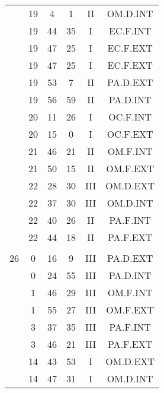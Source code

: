 \documentclass[12pt, a4paper]{article}
\begin{document}
\begin{multicols}{3}
{\begin{tabular}{c c c c c c}
	 	 	 	 & 19 & 4 & 1 & II & OM.D.INT\\%
	 	 	 	 & 19 & 44 & 35 & I & EC.F.INT\\%
	 	 	 	 & 19 & 47 & 25 & I & EC.F.EXT\\%
	 	 	 	 & 19 & 47 & 25 & I & EC.F.EXT\\%
	 	 	 	 & 19 & 53 & 7 & II & PA.D.EXT\\%
	 	 	 	 & 19 & 56 & 59 & II & PA.D.INT\\%
	 	 	 	 & 20 & 11 & 26 & I & OC.F.INT\\%
	 	 	 	 & 20 & 15 & 0 & I & OC.F.EXT\\%
	 	 	 	 & 21 & 46 & 21 & II & OM.F.INT\\%
	 	 	 	 & 21 & 50 & 15 & II & OM.F.EXT\\%
	 	 	 	 & 22 & 28 & 30 & III & OM.D.EXT\\%
	 	 	 	 & 22 & 37 & 30 & III & OM.D.INT\\%
	 	 	 	 & 22 & 40 & 26 & II & PA.F.INT\\%
	 	 	 	 & 22 & 44 & 18 & II & PA.F.EXT\\%
	 	 	 	 & & & & & \\%
	 	 	 	26 & 0 & 16 & 9 & III & PA.D.EXT\\%
	 	 	 	 & 0 & 24 & 55 & III & PA.D.INT\\%
	 	 	 	 & 1 & 46 & 29 & III & OM.F.INT\\%
	 	 	 	 & 1 & 55 & 27 & III & OM.F.EXT\\%
	 	 	 	 & 3 & 37 & 35 & III & PA.F.INT\\%
	 	 	 	 & 3 & 46 & 21 & III & PA.F.EXT\\%
	 	 	 	 & 14 & 43 & 53 & I & OM.D.EXT\\%
	 	 	 	 & 14 & 47 & 31 & I & OM.D.INT\\%

\end{tabular}}
\end{multicols}
\end{document}
